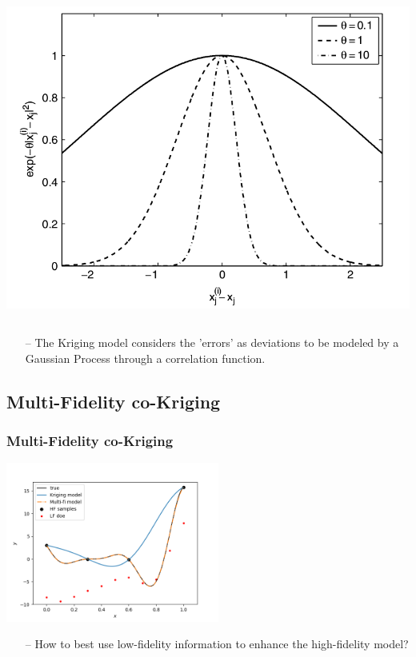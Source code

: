 \documentclass{beamer}
\theoremstyle{remark}
\theoremstyle{plain}
\begin{document}
\begin{frame}
\begin{columns}
\begin{column}{0.35\linewidth}
\begin{center}
        \includegraphics[width=0.95\linewidth]{Kriging/corr}
      \end{center}
    \end{column}
  \end{columns}
  \normalsize
  \small
  \begin{itemize}
  \item[--] The Kriging model considers the 'errors' as deviations to be modeled by a Gaussian Process through a correlation function.
  \end{itemize}
\end{frame}


\subsection{Multi-Fidelity co-Kriging}
\label{sec:partie2}
\begin{frame}[fragile]
  \frametitle{Multi-Fidelity co-Kriging}
      \begin{center}
        \includegraphics[width=7cm]{Kriging/illust_multi}
      \end{center}
      \begin{itemize}
      \item[--] How to best use low-fidelity information to enhance the high-fidelity model?
      \end{itemize}
\end{frame}
\end{document}
